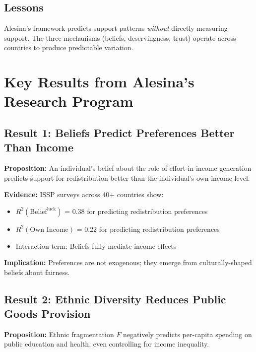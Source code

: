 \subsection{Lessons}

Alesina's framework predicts support patterns \textit{without} directly measuring support. The three mechanisms (beliefs, deservingness, trust) operate across countries to produce predictable variation.

\clearpage


\section{Key Results from Alesina's Research Program}
\label{sec:alesina-results}

\subsection{Result 1: Beliefs Predict Preferences Better Than Income}

\textbf{Proposition:} An individual's belief about the role of effort in income generation predicts support for redistribution better than the individual's own income level.

\textbf{Evidence:} ISSP surveys across 40+ countries show:
\begin{itemize}
\item $R^2(\text{Belief}^{\text{luck}})$  = 0.38 for predicting redistribution preferences
\item $R^2(\text{Own Income})$ = 0.22 for predicting redistribution preferences
\item Interaction term: Beliefs fully mediate income effects
\end{itemize}

\textbf{Implication:} Preferences are not exogenous; they emerge from culturally-shaped beliefs about fairness.

\subsection{Result 2: Ethnic Diversity Reduces Public Goods Provision}

\textbf{Proposition:} Ethnic fragmentation $F$ negatively predicts per-capita spending on public education and health, even controlling for income inequality.

